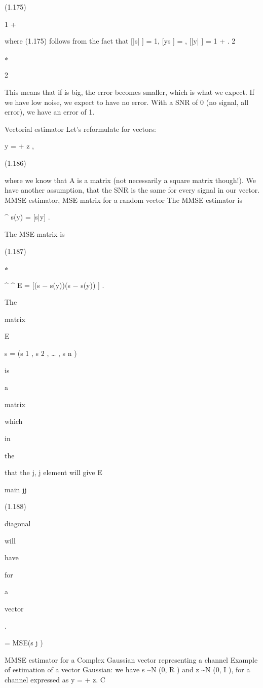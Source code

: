 {(1.175)

1 + \rho

where (1.175) follows from the fact that [|s| ] = 1, [ys ] = \sqrt{\rho}, [|y| ] = 1 + \rho.
2

∗

2

This means that if \rho is big, the error becomes smaller, which is what we expect.
If we have low noise, we expect to have no error.
With a SNR of 0 (no signal, all error), we have an error of 1.

Vectorial estimator Let's reformulate for vectors:

y = \sqrt{\rhoAs} + z ,

(1.186)

where we know that A is a matrix (not necessarily a square matrix though!).
We have another assumption, that the SNR is the same for every signal in our vector.
​MMSE estimator, MSE matrix for a random vector The MMSE estimator is

^
s(y)
= [s|y] .

The MSE matrix is

(1.187)

∗

^
^
E = [(s − s(y))(s
− s(y))
] .

The

matrix

E

s = (s 1 , s 2 , … , s n )

is

a

matrix

which

in

the

that the j, j element will give E

main jj

(1.188)

diagonal

will

have

for

a

vector

.

= MSE(s j )

MMSE estimator for a Complex Gaussian vector representing a channel Example of estimation of a vector Gaussian: we have s \sim N (0, R ) and z \sim N (0, I ), for a channel expressed as y = \sqrt{\rhoAs} + z.
C

}
